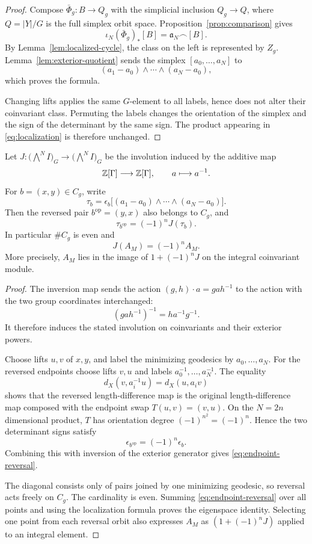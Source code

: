 \begin{proof}
Compose $\bar\Phi_g:B\to Q_g$ with the
simplicial inclusion $Q_g\to Q$, where
$Q=|Y|/G$ is the full simplex orbit space.
Proposition~\ref{prop:comparison} gives
\[
 \iota_N(\bar\Phi_g)_*[B]
 =\mathfrak a_N\frown[B].
\]
By Lemma~\ref{lem:localized-cycle}, the class
on the left is represented by $Z_g$.
Lemma~\ref{lem:exterior-quotient} sends
the simplex $[a_0,\ldots,a_N]$ to
\[
 (a_1-a_0)\wedge\cdots\wedge(a_N-a_0),
\]
which proves the formula.

Changing lifts applies the same $G$-element
to all labels, hence does not alter their
coinvariant class. Permuting the labels
changes the orientation of the simplex and
the sign of the determinant by the same
sign. The product appearing in
\eqref{eq:localization} is therefore unchanged.
\end{proof}

\begin{proposition}\label{prop:endpoint-reversal}
Let $J:\bigl(\bigwedge^N I\bigr)_G\to
\bigl(\bigwedge^N I\bigr)_G$ be the involution
induced by the additive map
\[
 \mathbb{Z}[\Gamma]\longrightarrow\mathbb{Z}[\Gamma],
 \qquad a\longmapsto a^{-1}.
\]
For $b=(x,y)\in C_g$, write
\[
 \tau_b=\epsilon_b
 \big[(a_1-a_0)\wedge\cdots\wedge(a_N-a_0)\big].
\]
Then the reversed pair $b^{\mathrm{op}}=(y,x)$
also belongs to $C_g$, and
\begin{equation}\label{eq:endpoint-reversal}
 \tau_{b^{\mathrm{op}}}=(-1)^n J(\tau_b).
\end{equation}
In particular $\#C_g$ is even and
\[
 J(A_M)=(-1)^n A_M.
\]
More precisely, $A_M$ lies in the image of
$1+(-1)^n J$ on the integral coinvariant module.
\end{proposition}

\begin{proof}
The inversion map sends the action
$(g,h)\cdot a=gah^{-1}$ to the action with
the two group coordinates interchanged:
\[
 (gah^{-1})^{-1}=h a^{-1}g^{-1}.
\]
It therefore induces the stated involution
on coinvariants and their exterior powers.

Choose lifts $u,v$ of $x,y$, and label the
minimizing geodesics by
$a_0,\ldots,a_N$. For the reversed endpoints
choose lifts $v,u$ and labels
$a_0^{-1},\ldots,a_N^{-1}$. The equality
\[
 d_X(v,a_i^{-1}u)=d_X(u,a_iv)
\]
shows that the reversed length-difference
map is the original length-difference map
composed with the endpoint swap
$T(u,v)=(v,u)$. On the $N=2n$ dimensional
product, $T$ has orientation degree
$(-1)^{n^2}=(-1)^n$. Hence the two
determinant signs satisfy
\[
 \epsilon_{b^{\mathrm{op}}}
 =(-1)^n\epsilon_b.
\]
Combining this with inversion of the
exterior generator gives
\eqref{eq:endpoint-reversal}.

The diagonal consists only of pairs joined
by one minimizing geodesic, so reversal acts
freely on $C_g$. The cardinality is even.
Summing \eqref{eq:endpoint-reversal}
over all points and using the localization
formula proves the eigenspace identity.
Selecting one point from each reversal
orbit also expresses $A_M$ as
$(1+(-1)^nJ)$ applied to an integral element.
\end{proof}


